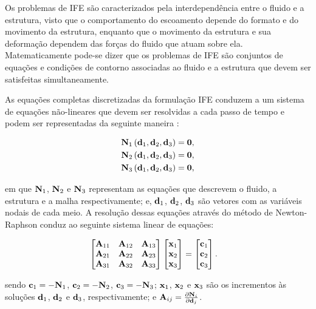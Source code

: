 Os problemas de IFE são caracterizados pela interdependência entre o fluido e a estrutura, visto que o comportamento do escoamento depende do formato e do movimento da estrutura, enquanto que o movimento da estrutura e sua deformação dependem das forças do fluido que atuam sobre ela. Matematicamente pode-se dizer que os problemas de IFE são conjuntos de equações e condições de contorno associadas ao fluido e a estrutura que devem ser satisfeitas simultaneamente.

As equações completas discretizadas da formulação IFE conduzem a um sistema de equações não-lineares que devem ser resolvidas a cada passo de tempo e podem ser representadas da seguinte maneira \cite{BazilevsTT:2013a}:

\begin{align}
	\mathbf{N}_{1}\left(\mathbf{d}_{1},\mathbf{d}_{2},\mathbf{d}_{3}\right) = \mathbf{0}, \label{eq:N1}\\ 
	\mathbf{N}_{2}\left(\mathbf{d}_{1},\mathbf{d}_{2},\mathbf{d}_{3}\right) = \mathbf{0},\label{eq:N2}\\
	\mathbf{N}_{3}\left(\mathbf{d}_{1},\mathbf{d}_{2},\mathbf{d}_{3}\right) = \mathbf{0} \label{eq:N3},
\end{align}

\noindent em que $\mathbf{N}_{1}$, $\mathbf{N}_{2}$ e $\mathbf{N}_{3}$ representam as equações que descrevem o fluido, a estrutura e a malha respectivamente; e, $\mathbf{d}_{1}$, $\mathbf{d}_{2}$, $\mathbf{d}_{3}$ são vetores com as variáveis nodais de cada meio. 
A resolução dessas equações através do método de Newton-Raphson conduz ao seguinte sistema linear de equações:

\begin{align}
	\begin{bmatrix}
		\mathbf{A}_{11} & \mathbf{A}_{12} & \mathbf{A}_{13} \\
		\mathbf{A}_{21} & \mathbf{A}_{22} & \mathbf{A}_{23} \\
		\mathbf{A}_{31} & \mathbf{A}_{32} & \mathbf{A}_{33}
	\end{bmatrix}
	\begin{bmatrix}
		\mathbf{x}_{1} \\
		\mathbf{x}_{2} \\
		\mathbf{x}_{3}
	\end{bmatrix}
	&=
	\begin{bmatrix}
		\mathbf{c}_{1} \\
		\mathbf{c}_{2} \\
		\mathbf{c}_{3}
	\end{bmatrix}.
	\label{eq:sist_lin_IFE}
\end{align}	

\noindent sendo $\mathbf{c}_{1} = - \mathbf{N}_{1}$, $\mathbf{c}_{2} = - \mathbf{N}_{2}$, $\mathbf{c}_{3} = - \mathbf{N}_{3}$; $\mathbf{x}_{1}$, $\mathbf{x}_{2}$ e $\mathbf{x}_{3}$ são os incrementos às soluções $\mathbf{d}_{1}$, $\mathbf{d}_{2}$ e $\mathbf{d}_{3}$, respectivamente; e $\mathbf{A}_{ij} = \frac{\partial\mathbf{N}_{i}}{\partial\mathbf{d}_{j}}$. 

